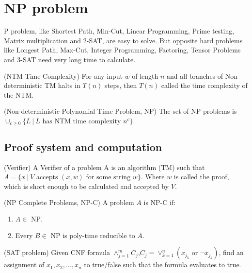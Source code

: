 
\usepackage{../../lectures_preamble}


    \section{NP problem}
    P problem, like Shortest Path, Min-Cut, Linear Programming, Prime testing, Matrix multiplication and 2-SAT, are easy to solve. But opposite hard problems like Longest Path, Max-Cut, Integer Programming, Factoring, Tensor Problems and 3-SAT need very long time to calculate.
    \begin{definition}
        (NTM Time Complexity) For any input $w$ of length $n$ and all branches of Non-deterministic TM halts in $T\left( n \right) $ steps, then $T\left( n \right) $ called the time complexity of the NTM.
    \end{definition}
    \begin{definition}
        (Non-deterministic Polynomial Time Problem, NP) The set of NP problems is $\cup_{c\ge 0}\{L\ |\ L \text{ has NTM time complexity } n^{c}\}$.
    \end{definition}
    \subsection{Proof system and computation}
    \begin{definition}
        (Verifier) A Verifier of a problem A is an algorithm (TM) such that $A=\{x\ |\ V\text{ accepts }\left( x,w \right) \text{ for some string } w\}$. Where $w$ is called the proof, which is short enough to be calculated and accepted by $V$.
    \end{definition}
    \begin{definition}
        (NP Complete Problems, NP-C) A problem $A$ is NP-C if:
        \begin{enumerate}
            \item $A\in$ NP.
            \item Every $B\in$ NP is poly-time reducible to $A$.
        \end{enumerate}
    \end{definition}
    \begin{definition}
        (SAT problem) Given CNF formula $\wedge_{j=1}^{m}C_{j}$,$C_{j}=\vee_{k=1}^{n}\left( x_{j_{k}}\text{ or }\lnot x_{j_{k}}\right) $, find an assignment of $x_1,x_2,\ldots,x_{n}$ to true/false such that the formula evaluates to true.
    \end{definition}
    

